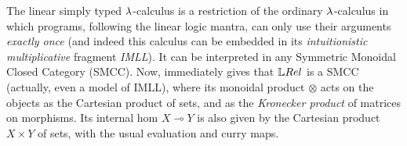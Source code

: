 The linear simply typed $\lambda$-calculus is a restriction of the ordinary $\lambda$-calculus in which programs, following the linear logic mantra, can only use their arguments \emph{exactly once} (and indeed this calculus can be embedded in its \emph{intuitionistic multiplicative} fragment \emph{IMLL}).
It can be interpreted in any Symmetric Monoidal Closed Category (SMCC).
Now, \cite[Section III.A]{Manzo2013} immediately gives that $\LREL$ is a SMCC (actually, even a model of IMLL), where its monoidal product $\otimes$ acts on the objects as the Cartesian product of sets, and as the \emph{Kronecker product}
 of matrices on morphisms.
Its internal hom $X\multimap Y$ is also given by the Cartesian product $X\times Y$ of sets, with the usual evaluation and curry maps.

